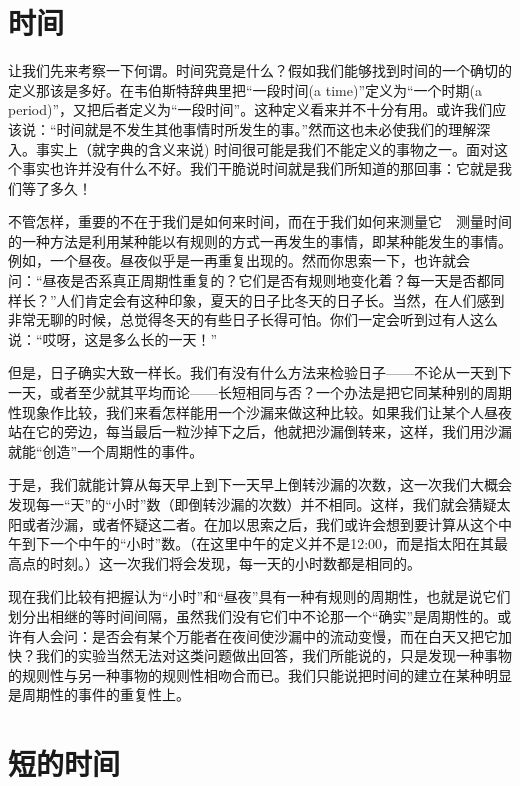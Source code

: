 \section{时间}

让我们先来考察一下何谓。时间究竟是什么？假如我们能够找到时间的一个确切的定义那该是多好。在韦伯斯特辞典里把“一段时间(a time)”定义为“一个时期(a period)”，又把后者定义为“一段时间”。这种定义看来并不十分有用。或许我们应该说：“时间就是不发生其他事情时所发生的事。”然而这也未必使我们的理解深入。事实上（就字典的含义来说) 时间很可能是我们不能定义的事物之一。面对这个事实也许并没有什么不好。我们干脆说时间就是我们所知道的那回事：它就是我们等了多久！

不管怎样，重要的不在于我们是如何来时间，而在于我们如何来测量它　测量时间的一种方法是利用某种能以有规则的方式一再发生的事情，即某种能发生的事情。例如，一个昼夜。昼夜似乎是一再重复出现的。然而你思索一下，也许就会问：“昼夜是否系真正周期性重复的？它们是否有规则地变化着？每一天是否都同样长？”人们肯定会有这种印象，夏天的日子比冬天的日子长。当然，在人们感到非常无聊的时候，总觉得冬天的有些日子长得可怕。你们一定会听到过有人这么说：“哎呀，这是多么长的一天！”

但是，日子确实大致一样长。我们有没有什么方法来检验日子——不论从一天到下一天，或者至少就其平均而论——长短相同与否？一个办法是把它同某种别的周期性现象作比较，我们来看怎样能用一个沙漏来做这种比较。如果我们让某个人昼夜站在它的旁边，每当最后一粒沙掉下之后，他就把沙漏倒转来，这样，我们用沙漏就能“创造”一个周期性的事件。

于是，我们就能计算从每天早上到下一天早上倒转沙漏的次数，这一次我们大概会发现每一“天”的“小时”数（即倒转沙漏的次数）并不相同。这样，我们就会猜疑太阳或者沙漏，或者怀疑这二者。在加以思索之后，我们或许会想到要计算从这个中午到下一个中午的“小时”数。（在这里中午的定义并不是12:00，而是指太阳在其最高点的时刻。）这一次我们将会发现，每一天的小时数都是相同的。

现在我们比较有把握认为“小时”和“昼夜”具有一种有规则的周期性，也就是说它们划分出相继的等时间间隔，虽然我们没有它们中不论那一个“确实”是周期性的。或许有人会问：是否会有某个万能者在夜间使沙漏中的流动变慢，而在白天又把它加快？我们的实验当然无法对这类问题做出回答，我们所能说的，只是发现一种事物的规则性与另一种事物的规则性相吻合而已。我们只能说把时间的建立在某种明显是周期性的事件的重复性上。


\section{短的时间}

